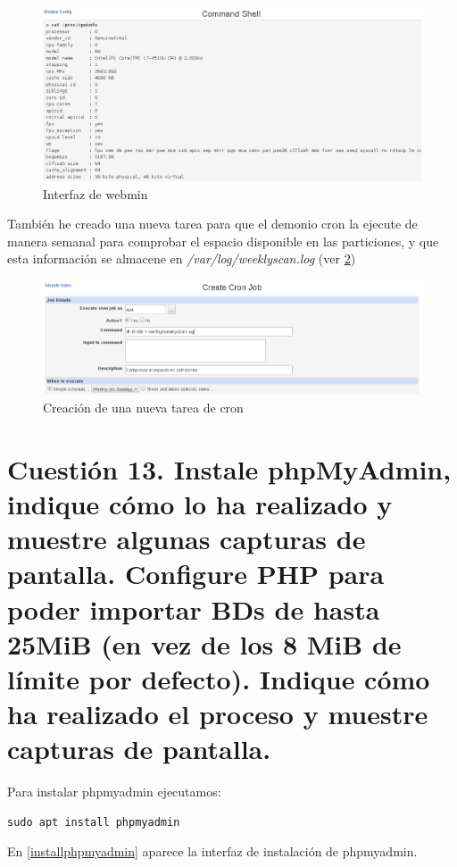 \begin{figure}[H]
	\centering
	\includegraphics[scale=0.45]{shell-prueba-cpuinfo.png}
	\caption{Interfaz de webmin} \label{shell-prueba-cpuinfo}
\end{figure}

También he creado una nueva tarea para que el demonio cron la ejecute de manera semanal para comprobar el espacio disponible en las particiones, y que esta información se almacene en \textit{/var/log/weeklyscan.log} (ver \ref{cron-job})
	
\begin{figure}[H]
	\centering
	\includegraphics[scale=0.45]{cron-job.png}
	\caption{Creación de una nueva tarea de cron} \label{cron-job}
\end{figure}

\section{Cuestión 13. Instale phpMyAdmin, indique cómo lo ha realizado y muestre algunas capturas de pantalla. Configure PHP para poder importar BDs de hasta 25MiB (en vez de los 8 MiB de límite por defecto). Indique cómo ha realizado el proceso y muestre capturas de pantalla.}

Para instalar phpmyadmin ejecutamos:

\begin{verbatim}
sudo apt install phpmyadmin
\end{verbatim}

En \ref{installphpmyadmin} aparece la interfaz de instalación de phpmyadmin.

